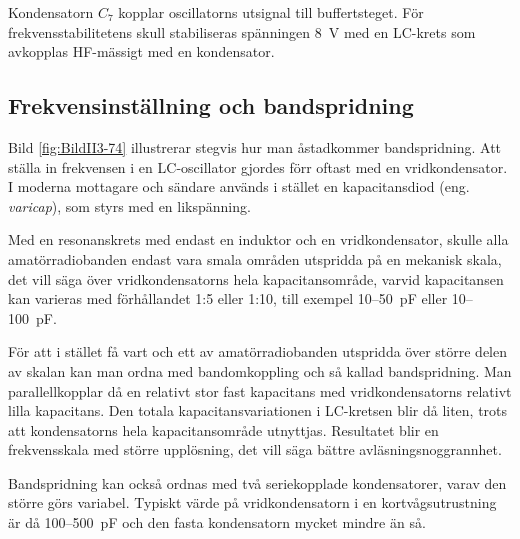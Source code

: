 Kondensatorn \(C_7\) kopplar oscillatorns utsignal till buffertsteget.
För frekvensstabilitetens skull stabiliseras spänningen \SI{8}{\volt} med en
LC-krets som avkopplas HF-mässigt med en kondensator.

\subsection{Frekvensinställning och bandspridning}


Bild \ref{fig:BildII3-74} illustrerar stegvis hur man åstadkommer
bandspridning.
Att ställa in frekvensen i en LC-oscillator gjordes förr oftast med en
vridkondensator.
I moderna mottagare och sändare används i stället en kapacitansdiod 
(eng. \emph{varicap}), som styrs med en likspänning.

Med en resonanskrets med endast en induktor och en vridkondensator, skulle
alla amatörradiobanden endast vara smala områden utspridda på en mekanisk
skala, det vill säga över vridkondensatorns hela kapacitansområde, varvid
kapacitansen kan varieras med förhållandet 1:5 eller 1:10, till exempel
10--50~pF eller 10--100~pF.

För att i stället få vart och ett av amatörradiobanden utspridda över större
delen av skalan kan man ordna med bandomkoppling och så kallad bandspridning.
Man parallellkopplar då en relativt stor fast kapacitans med vridkondensatorns
relativt lilla kapacitans.
Den totala kapacitansvariationen i LC-kretsen blir då liten, trots att
kondensatorns hela kapacitansområde utnyttjas.
Resultatet blir en frekvensskala med större upplösning, det vill säga bättre
avläsningsnoggrannhet.

Bandspridning kan också ordnas med två seriekopplade kondensatorer,
varav den större görs variabel.
Typiskt värde på vridkondensatorn i en kortvågsutrustning är då 100--500~pF
och den fasta kondensatorn mycket mindre än så.
